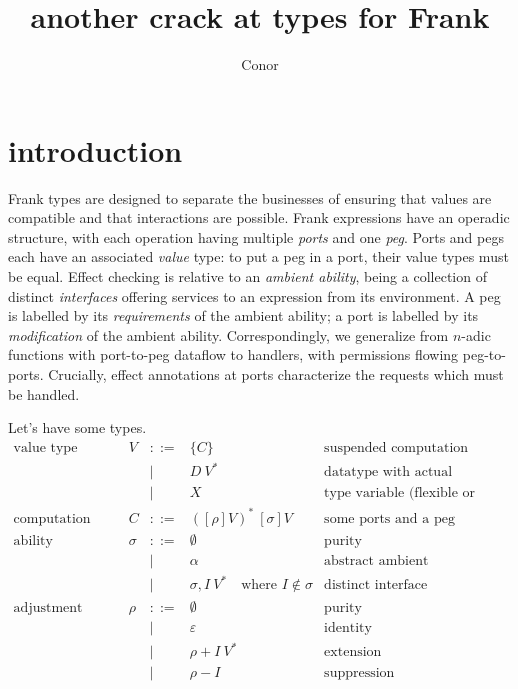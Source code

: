 \documentclass{article}
\begin{document}
\title{another crack at types for Frank}
\author{Conor}
\maketitle

\section{introduction}

Frank types are designed to separate the businesses of ensuring that values are compatible and that interactions are possible. Frank expressions have an operadic structure, with each operation having multiple \emph{ports} and one \emph{peg}. Ports and pegs each have an associated \emph{value} type: to put a peg in a port, their value types must be equal. Effect checking is relative to an \emph{ambient ability}, being a collection of distinct \emph{interfaces} offering services to an expression from its environment. A peg is labelled by its \emph{requirements} of the ambient ability; a port is labelled by its \emph{modification} of the ambient ability. Correspondingly, we generalize from $n$-adic functions with port-to-peg dataflow to handlers, with permissions flowing peg-to-ports. Crucially, effect annotations at ports characterize the requests which must be handled.

Let's have some types.
\newcommand{\ix}[2]{\ulcorner #2 \urcorner^{#1}}
\newcommand{\ixp}[2]{( #2 )^{#1}}
\[\begin{array}{lrrll}
\mbox{value type} &
V & ::= & \{C\} & \mbox{suspended computation} \\
  && | & D\:V^\ast & \mbox{datatype with actual parameters} \\
  && | & X & \mbox{type variable (flexible or rigid)}\\
\mbox{computation type} &
C & ::= & ([\rho]V)^\ast\:[\sigma]V  & \mbox{some ports and a peg}\\
\mbox{ability} &
\sigma & ::= & \emptyset & \mbox{purity} \\
   && | & \alpha & \mbox{abstract ambient} \\
   && | & \sigma, I\:V^\ast\quad\mbox{where $I\not\in\sigma$} & \mbox{distinct interface}\\
\mbox{adjustment} &
\rho & ::= & \emptyset & \mbox{purity} \\
   && | & \varepsilon & \mbox{identity} \\
   && | & \rho + I\:V^\ast & \mbox{extension}\\
   && | & \rho - I & \mbox{suppression}\\
\end{array}\]
\end{document}
